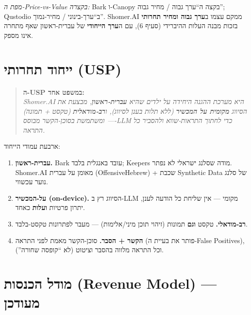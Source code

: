 \documentclass[11pt]{article}
\newcommand{\en}[1]{\textenglish{#1}}
\begin{document}
\textit{מפת ה-\en{Price-vs-Value} בקצרה:} \en{Bark} ו-\en{Canopy} בקצה ה``ערך גבוה / מחיר גבוה''; \en{Qustodio} ב``ערך-בינוני / מחיר-נמוך''. \en{Shomer.AI} ממקם עצמו ב\textbf{ערך גבוה ומחיר תחרותי} בזכות מבנה העלות ההיברידי (סעיף 6), עם ה\textbf{ערך הייחודי} של עברית-ראשון שאף מתחרה אינו מספק.

\section{ייחוד תחרותי (\en{USP})}

\begin{quote}
\textbf{ה-\en{USP} במשפט אחד:}\\[2pt]
\textit{\en{Shomer.AI} היא מערכת ההגנה היחידה על ילדים שהיא \textbf{עברית-ראשון}, מבצעת את הסיווג \textbf{מקומית על המכשיר} (ללא תלות בענן לסיווג), ו\textbf{רב-מודאלית} (טקסט + תמונה) — ומשתמשת בסוכן-הקשר מבוסס-\en{LLM} כדי לחתוך התראות-שווא ולהסביר כל התראה.}
\end{quote}

ארבעת עמודי הייחוד:
\begin{enumerate}[leftmargin=*]
  \item \textbf{עברית-ראשון.} \en{Bark} עובד באנגלית בלבד; \en{Keepers} מודה שסלנג ישראלי לא נפתר. \en{Shomer.AI} מאומן על עברית (\en{OffensiveHebrew}) + שכבת \en{Synthetic Data} של סלנג נוער עכשווי.
  \item \textbf{על-המכשיר (\en{on-device}).} הסיווג רץ ב-\en{LLM} מקומי — אין שליחת כל הודעה לענן, יתרון פרטיות \textbf{ועלות} כאחד.
  \item \textbf{רב-מודאלי.} טקסט \textbf{וגם} תמונות (זיהוי תוכן מיני/אלימות) — מעבר לפתרונות טקסט-בלבד.
  \item \textbf{הקשר + הסבר.} סוכן-הקשר מאמת לפני התראה (פותר את בעיית ה-\en{False Positives}), וכל התראה מלווה בהסבר וציטוט (לא ``קופסה שחורה'').
\end{enumerate}

\section{מודל הכנסות (\en{Revenue Model}) — מעודכן}
\end{document}
